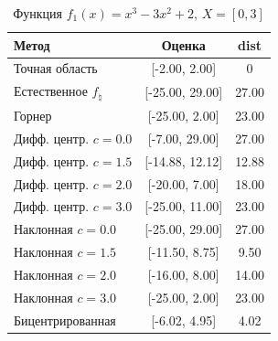 \begin{table}[H]
\centering
\begin{tabular}{|l|c|c|}
\hline
Метод & Оценка & dist \\
\hline
Точная область & [-2.00, 2.00] & 0 \\
Естественное $f_{\natural}$ & [-25.00, 29.00] & 27.00 \\
Горнер & [-25.00, 2.00] & 23.00 \\
Дифф. центр. $c=0.0$ & [-7.00, 29.00] & 27.00 \\
Дифф. центр. $c=1.5$ & [-14.88, 12.12] & 12.88 \\
Дифф. центр. $c=2.0$ & [-20.00, 7.00] & 18.00 \\
Дифф. центр. $c=3.0$ & [-25.00, 11.00] & 23.00 \\
Наклонная $c=0.0$ & [-25.00, 29.00] & 27.00 \\
Наклонная $c=1.5$ & [-11.50, 8.75] & 9.50 \\
Наклонная $c=2.0$ & [-16.00, 8.00] & 14.00 \\
Наклонная $c=3.0$ & [-25.00, 2.00] & 23.00 \\
Бицентрированная & [-6.02, 4.95] & 4.02 \\
\hline
\end{tabular}
\caption{Функция $f_1(x)=x^3-3x^2+2$, $X=[0,3]$}
\end{table}
